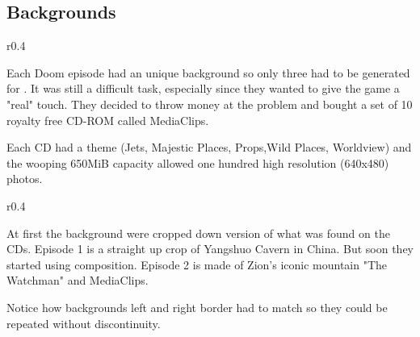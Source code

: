 \subsection{Backgrounds}

\begin{wrapfigure}[7]{r}{0.4\textwidth}
\centering
{}
\end{wrapfigure}

Each Doom episode had an unique background so only three had to be generated for . It was still a difficult task, especially since they wanted to give the game a "real" touch. They decided to throw money at the problem and bought a set of 10 royalty free CD-ROM called MediaClips.\\
\par Each CD had a theme (Jets, Majestic Places, Props,Wild Places, Worldview) and the wooping 650MiB capacity allowed one hundred high resolution (640x480) photos.\\
\par

\begin{wrapfigure}[7]{r}{0.4\textwidth}
\centering
{}
\end{wrapfigure}

At first the background were cropped down version of what was found on the CDs. Episode 1 is a straight up crop of Yangshuo Cavern in China. But soon they started using composition. Episode 2 is made of Zion's iconic mountain "The Watchman" and  MediaClips.\\
\par

Notice how backgrounds left and right border had to match so they could be repeated without discontinuity.\\
\par
{}\\
\par
{}\\


\begin{minipage}{\textwidth}
\end{minipage}






\begin{minipage}{\textwidth}
{}
\end{minipage}
\par






\begin{minipage}{\textwidth}
\par
{}
\end{minipage}


\begin{minipage}{\textwidth}
\par
{}
\end{minipage}







